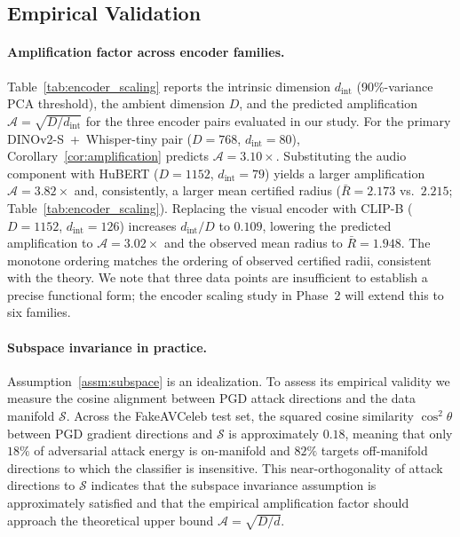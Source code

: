 \subsection{Empirical Validation}
\label{sec:theory:validation}

\paragraph*{Amplification factor across encoder families.}
Table~\ref{tab:encoder_scaling} reports the intrinsic dimension
$d_\text{int}$ (90\%-variance PCA threshold), the ambient dimension
$D$, and the predicted amplification $\mathcal{A} = \sqrt{D/d_\text{int}}$
for the three encoder pairs evaluated in our study.
For the primary DINOv2-S~+~Whisper-tiny pair ($D=768$, $d_\text{int}=80$),
Corollary~\ref{cor:amplification} predicts $\mathcal{A}=3.10\times$.
Substituting the audio component with HuBERT ($D=1152$,
$d_\text{int}=79$) yields a larger amplification $\mathcal{A}=3.82\times$
and, consistently, a larger mean certified radius
($\bar{R}=2.173$ vs.\ $2.215$; Table~\ref{tab:encoder_scaling}).
Replacing the visual encoder with CLIP-B ($D=1152$, $d_\text{int}=126$)
increases $d_\text{int}/D$ to $0.109$, lowering the predicted
amplification to $\mathcal{A}=3.02\times$ and the observed mean
radius to $\bar{R}=1.948$.
The monotone ordering 
matches the ordering of observed certified radii, consistent
with the theory.
We note that three data points are insufficient to establish a precise
functional form; the encoder scaling study in Phase~2 will extend
this to six families.

\paragraph*{Subspace invariance in practice.}
Assumption~\ref{assm:subspace} is an idealization.
To assess its empirical validity we measure the cosine alignment
between PGD attack directions and the data manifold $\mathcal{S}$.
Across the FakeAVCeleb test set, the squared cosine similarity
$\cos^2\theta$ between PGD gradient directions and $\mathcal{S}$ is
approximately $0.18$, meaning that only $18\%$ of adversarial attack
energy is on-manifold and $82\%$ targets off-manifold directions to
which the classifier is insensitive.
This near-orthogonality of attack directions to $\mathcal{S}$
indicates that the subspace invariance assumption is
approximately satisfied and that the empirical amplification factor
should approach the theoretical upper bound $\mathcal{A}=\sqrt{D/d}$.

